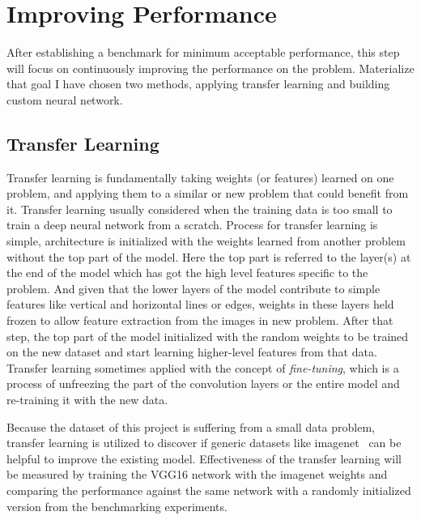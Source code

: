 
\section{Improving Performance}
After establishing a benchmark for minimum acceptable performance, this step will focus on continuously improving the performance on the problem. 
Materialize that goal I have chosen two methods, applying transfer learning and building custom neural network.

\subsection{Transfer Learning} \label{subsec:transferlearning}
Transfer learning is fundamentally taking weights (or features) learned on one problem, and applying them to a similar or new problem that could benefit from it.
Transfer learning usually considered when the training data is too small to train a deep neural network from a scratch.
Process for transfer learning is simple, architecture is initialized with the weights learned from another problem without the top part of the model.
Here the top part is referred to the layer(s) at the end of the model which has got the high level features specific to the problem.
And given that the lower layers of the model contribute to simple features like vertical and horizontal lines or edges, weights in these layers held frozen to allow feature extraction from the images in new problem.
After that step, the top part of the model initialized with the random weights to be trained on the new dataset and start learning higher-level features from that data.
Transfer learning sometimes applied with the concept of \emph{fine-tuning}, which is a process of unfreezing the part of the convolution layers or the entire model and re-training it with the new data.

Because the dataset of this project is suffering from a small data problem, transfer learning is utilized to discover if generic datasets like imagenet~\cite{imagenet} can be helpful to improve the existing model.
Effectiveness of the transfer learning will be measured by training the VGG16 network with the imagenet weights and comparing the performance against the same network with a randomly initialized version from the benchmarking experiments.


